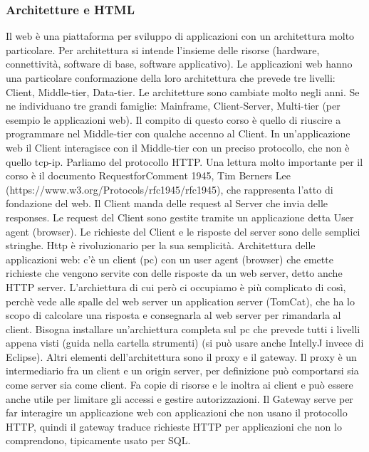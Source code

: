 \subsubsection{Architetture e HTML}
Il web è una piattaforma per sviluppo di applicazioni con un architettura molto particolare. Per architettura si intende l'insieme delle risorse (hardware, connettività, software di base, software applicativo).\newline
Le applicazioni web hanno una particolare conformazione della loro architettura che prevede tre livelli: Client, Middle-tier, Data-tier.\newline 
Le architetture sono  cambiate molto negli anni. Se ne individuano tre grandi famiglie: Mainframe, Client-Server, Multi-tier (per esempio le applicazioni web). \newline
Il compito di questo corso è quello di riuscire a programmare nel Middle-tier con qualche accenno al Client.\newline
In un'applicazione web il Client interagisce con il Middle-tier con un preciso protocollo, che non è quello tcp-ip. Parliamo del protocollo HTTP.\newline
Una lettura molto importante per il corso è il documento RequestforComment 1945, Tim Berners Lee (https://www.w3.org/Protocols/rfc1945/rfc1945), che rappresenta l'atto di fondazione del web.\newline
Il Client manda delle request al Server che invia delle responses. Le request del Client sono gestite tramite un applicazione detta User agent (browser).\newline
Le richieste del Client e le risposte del server sono delle semplici stringhe. Http è rivoluzionario per la sua semplicità.\newline
Architettura delle applicazioni web: c'è un client (pc) con un user agent (browser) che emette richieste che vengono servite con delle risposte da un web server, detto anche HTTP server. L'archiettura di cui però ci occupiamo è più complicato di così, perchè vede alle spalle del web server un application server (TomCat), che ha lo scopo di calcolare una risposta e consegnarla al web server per rimandarla al client.\newline
Bisogna installare un'archiettura completa sul pc che prevede tutti i livelli appena visti (guida nella cartella strumenti) (si può usare anche IntellyJ invece di Eclipse).\newline
Altri elementi dell'architettura sono il proxy e il gateway. Il proxy è un intermediario fra un client e un origin server, per definizione può comportarsi sia come server sia come client. Fa copie di risorse e le inoltra ai client e può essere anche utile per limitare gli accessi e gestire autorizzazioni. Il Gateway serve per far interagire un applicazione web con applicazioni che non usano il protocollo HTTP, quindi il gateway traduce richieste HTTP per applicazioni che non lo comprendono, tipicamente usato per SQL.\newline
